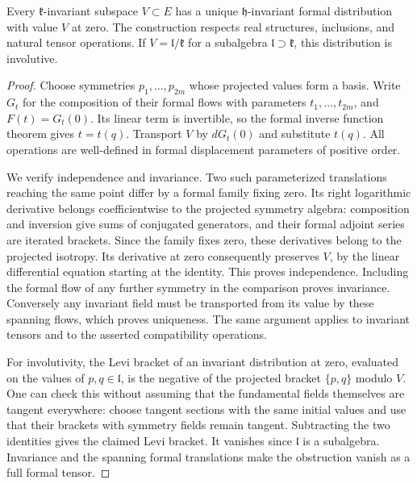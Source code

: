 \begin{proposition}
\label{sym:homogeneous-fields}
Every $\mathfrak k$-invariant subspace $V\subset E$ has a unique
$\mathfrak h$-invariant formal distribution with value $V$ at zero.
The construction respects real structures, inclusions, and natural
tensor operations.  If $V=\mathfrak l/\mathfrak k$ for a subalgebra
$\mathfrak l\supset\mathfrak k$, this distribution is involutive.
\end{proposition}

\begin{proof}
Choose symmetries $p_1,\ldots,p_{2m}$ whose projected values form a
basis.  Write $G_t$ for the composition of their formal flows with
parameters $t_1,\ldots,t_{2m}$, and $F(t)=G_t(0)$.  Its linear term
is invertible, so the formal inverse function theorem gives $t=t(q)$.
Transport $V$ by $dG_t(0)$ and substitute $t(q)$.  All operations are
well-defined in formal displacement parameters of positive order.

We verify independence and invariance.  Two such parameterized
translations reaching the same point differ by a formal family
fixing zero.  Its right logarithmic derivative belongs
coefficientwise to the projected symmetry algebra: composition and
inversion give sums of conjugated generators, and their formal
adjoint series are iterated brackets.  Since the family fixes zero,
these derivatives belong to the projected isotropy.  Its derivative
at zero consequently preserves $V$, by the linear differential
equation starting at the identity.  This proves independence.
Including the formal flow of any further symmetry in the comparison
proves invariance.  Conversely any invariant field must be
transported from its value by these spanning flows, which proves
uniqueness.  The same argument applies to invariant tensors and to
the asserted compatibility operations.

For involutivity, the Levi bracket of an invariant distribution at
zero, evaluated on the values of $p,q\in\mathfrak l$, is the negative
of the projected bracket $\{p,q\}$ modulo $V$.  One can check this
without assuming that the fundamental fields themselves are tangent
everywhere: choose tangent sections with the same initial values
and use that their brackets with symmetry fields remain tangent.
Subtracting the two identities gives the claimed Levi bracket.
It vanishes since $\mathfrak l$ is a subalgebra.  Invariance and the
spanning formal translations make the obstruction vanish as a full
formal tensor.
\end{proof}


